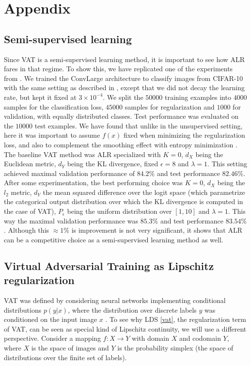 \documentclass{article}
\begin{document}



\newpage

\appendix
\section{Appendix}

\subsection{Semi-supervised learning} \label{semisup}
Since VAT is a semi-supervised learning method, it is important to see how ALR fares in that regime. To show this, we have replicated one of the experiments from \citet{Miyatoetal2017}. We trained the ConvLarge architecture to classify images from CIFAR-10 with the same setting as described in  \citet{Miyatoetal2017}, except that we did not decay the learning rate, but kept it fixed at $3 \times 10^{-4}$. We split the $50000$ training examples into $4000$ samples for the classification loss, $45000$ samples for regularization and $1000$ for validation, with equally distributed classes. Test performance was evaluated on the $10000$ test examples. We have found that unlike in the unsupervised setting, here it was important to assume $f(x)$ fixed when minimizing the regularization loss, and also to complement the smoothing effect with entropy minimization \citep{Grandvaletetal2005}. The baseline VAT method was ALR specialized with $K=0$, $d_X$ being the Euclidean metric, $d_Y$ being the KL divergence, fixed $\epsilon=8$ and $\lambda=1$. This setting achieved maximal validation performance of $84.2\%$ and test performance $82.46\%$. After some experimentation, the best performing choice was $K=0$, $d_X$ being the $l_2$ metric, $d_Y$ the mean squared difference over the logit space (which parametrize the categorical output distribution over which the KL divergence is computed in the case of VAT), $P_\epsilon$ being the uniform distribution over $[1, 10]$ and $\lambda=1$. This way the maximal validation performance was $85.3\%$ and test performance $83.54\%$. Although this $\approx 1 \%$ is improvement is not very significant, it shows that ALR can be a competitive choice as a semi-supervised learning method as well.

\subsection{Virtual Adversarial Training as Lipschitz regularization} \label{vat_as_lr}
VAT was defined by considering neural networks implementing conditional distributions $p(y\vert x)$, where the distribution over discrete labels $y$ was conditioned on the input image $x$ \cite{Miyatoetal2017}. To see why LDS \eqref{vat}, the regularization term of VAT, can be seen as special kind of Lipschitz continuity, we will use a different perspective. Consider a mapping $f:X\to Y$ with domain $X$ and codomain $Y$, where $X$ is the space of images and $Y$ is the probability simplex (the space of distributions over the finite set of labels).
\end{document}
